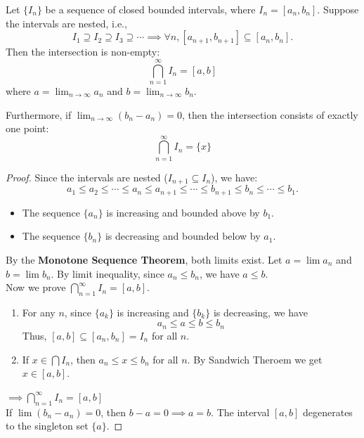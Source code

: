 \documentclass[
	UTF-8,
	11pt, %
	a4paper, %
]{LegrandOrangeBook}
\begin{document}
    \begin{theorem}
    Let $\{I_n\}$ be a sequence of closed bounded intervals, where $I_n = [a_n, b_n]$. Suppose the intervals are nested, i.e.,
    \[ I_1 \supseteq I_2 \supseteq I_3 \supseteq \cdots \implies \forall n, [a_{n+1}, b_{n+1}] \subseteq [a_n, b_n]. \]
    Then the intersection is non-empty:
    \[ \bigcap_{n=1}^{\infty} I_n = [a, b] \]
    where $a = \lim_{n \to \infty} a_n$ and $b = \lim_{n \to \infty} b_n$.

    Furthermore, if $\lim_{n \to \infty} (b_n - a_n) = 0$, 
    then the intersection consists of exactly one point:
    \[ \bigcap_{n=1}^{\infty} I_n = \{x\} \]
    \end{theorem}

    \begin{proof}
    Since the intervals are nested ($I_{n+1} \subseteq I_n$), we have:
    \[ a_1 \le a_2 \le \cdots \le a_n \le a_{n+1} \le \cdots \le b_{n+1} \le b_n \le \cdots \le b_1. \]
    \begin{itemize}[itemsep = 0.5em, topsep = 0.5em]
        \item The sequence $\{a_n\}$ is increasing and bounded above by $b_1$.
        \item The sequence $\{b_n\}$ is decreasing and bounded below by $a_1$.
    \end{itemize}
    By the \textbf{Monotone Sequence Theorem}, both limits exist. Let $a = \lim a_n$ and $b = \lim b_n$.
    By limit inequality, since $a_n \le b_n$, we have $a \le b$.\\

    Now we prove $\bigcap_{n=1}^{\infty} I_n = [a, b]$.
    \begin{enumerate}
        \item For any $n$, since $\{a_k\}$ is increasing and $\{b_k\}$ is decreasing, 
        we have $$a_n \le a \le b \le b_n$$
        Thus, $[a, b] \subseteq [a_n, b_n] = I_n$ for all $n$. 
        \item If $x \in \bigcap I_n$, then $a_n \le x \le b_n$ for all $n$. 
            By Sandwich Theroem we get $x \in [a, b]$.
    \end{enumerate}
    $\implies \bigcap_{n=1}^{\infty} I_n = [a, b] $\\

    If $\lim (b_n - a_n) = 0$, then $b - a = 0 \implies a = b$. 
    The interval $[a, b]$ degenerates to the singleton set $\{a\}$.
    \end{proof}
\end{document}
